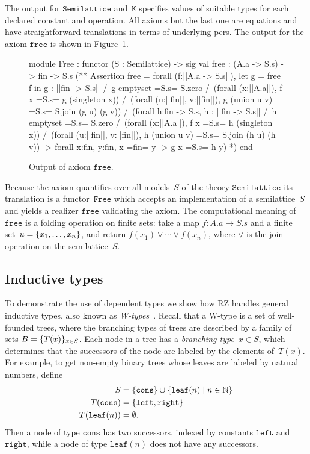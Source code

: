 The output for $\mathtt{Semilattice}$ and~$\mathtt{K}$ specifies
values of suitable types for each declared constant and operation. All
axioms but the last one are equations and have straightforward
translations in terms of underlying pers. The output for the axiom
$\mathtt{free}$ is shown in Figure~\ref{fig:free}.
%
\begin{figure}
  \centering
\begin{source}
module Free : functor (S : Semilattice) ->
sig
val free : (A.a -> S.s) -> fin -> S.s
(**  Assertion free = 
forall (f:||A.a -> S.s||), 
  let g = free f in g : ||fin -> S.s|| /\ 
  g emptyset =S.s= S.zero /\ 
  (forall (x:||A.a||),  f x =S.s= g (singleton x)) /\ 
  (forall (u:||fin||, v:||fin||), g (union u v) =S.s= S.join (g u) (g v)) /\ 
  (forall h:fin -> S.s,  h : ||fin -> S.s|| /\ 
     h emptyset =S.s= S.zero /\ 
     (forall (x:||A.a||), f x =S.s= h (singleton x)) /\ 
     (forall (u:||fin||, v:||fin||), 
        h (union u v) =S.s= S.join (h u) (h v)) ->
     forall x:fin, y:fin,  x =fin= y -> g x =S.s= h y)
*)
end
\end{source}
  \caption{Output of axiom $\texttt{free}$.}
  \label{fig:free}
\end{figure}
%
Because the axiom quantifies over all models~$S$ of the theory
$\mathtt{Semilattice}$ its translation is a functor~$\mathtt{Free}$
which accepts an implementation of a semilattice~$S$ and yields a
realizer $\mathtt{free}$ validating the axiom. The computational
meaning of $\mathtt{free}$ is a folding operation on finite sets: take
a map $f : A.a \to S.s$ and a finite set~$u = \{x_1, \ldots, x_n\}$,
and return $f(x_1) \vee \cdots \vee f(x_n)$, where $\vee$ is the join
operation on the semilattice~$S$.

\subsection{Inductive types}
\label{sec:inductive-types}

To demonstrate the use of dependent types we show how RZ handles
general inductive types, also known as
\emph{W-types}~\cite{w-type-reference}. Recall that a W-type is a set
of well-founded trees, where the branching types of trees are
described by a family of sets $B = \{T(x)\}_{x \in S}$. Each node in
a tree has a \emph{branching type}~$x \in S$, which determines that
the successors of the node are labeled by the elements of~$T(x)$. For
example, to get non-empty binary trees whose leaves are labeled by
natural numbers, define
%
\begin{align*}
  S &= \{\mathtt{cons}\} \cup \{\mathtt{leaf}(n) \mid n \in \mathbb{N}\}
  \\
  T(\mathtt{cons}) &= \{\mathtt{left}, \mathtt{right}\}
  \\
  T(\mathtt{leaf}(n)) &= \emptyset.
\end{align*}
%
Then a node of type $\mathtt{cons}$ has two successors, indexed by
constants $\mathtt{left}$ and $\mathtt{right}$, while a node of type
$\mathtt{leaf}(n)$ does not have any successors.

